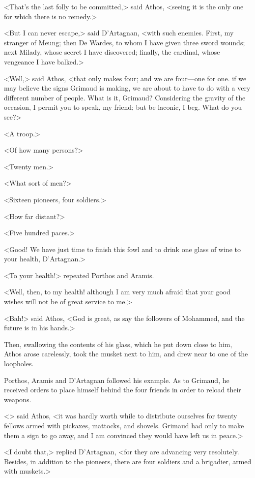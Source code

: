 <That's the last folly to be committed,> said Athos, <seeing it is the only one for which there is no remedy.> 

<But I can never escape,> said D'Artagnan, <with such enemies. First, my stranger of Meung; then De Wardes, to whom I have given three sword wounds; next Milady, whose secret I have discovered; finally, the cardinal, whose vengeance I have balked.> 

<Well,> said Athos, <that only makes four; and we are four—one for one.  if we may believe the signs Grimaud is making, we are about to have to do with a very different number of people. What is it, Grimaud? Considering the gravity of the occasion, I permit you to speak, my friend; but be laconic, I beg. What do you see?> 

<A troop.> 

<Of how many persons?> 

<Twenty men.> 

<What sort of men?> 

<Sixteen pioneers, four soldiers.> 

<How far distant?> 

<Five hundred paces.> 

<Good! We have just time to finish this fowl and to drink one glass of wine to your health, D'Artagnan.> 

<To your health!> repeated Porthos and Aramis. 

<Well, then, to my health! although I am very much afraid that your good wishes will not be of great service to me.> 

<Bah!> said Athos, <God is great, as say the followers of Mohammed, and the future is in his hands.> 

Then, swallowing the contents of his glass, which he put down close to him, Athos arose carelessly, took the musket next to him, and drew near to one of the loopholes. 

Porthos, Aramis and D'Artagnan followed his example. As to Grimaud, he received orders to place himself behind the four friends in order to reload their weapons. 

<> said Athos, <it was hardly worth while to distribute ourselves for twenty fellows armed with pickaxes, mattocks, and shovels. Grimaud had only to make them a sign to go away, and I am convinced they would have left us in peace.> 

<I doubt that,> replied D'Artagnan, <for they are advancing very resolutely. Besides, in addition to the pioneers, there are four soldiers and a brigadier, armed with muskets.> 

